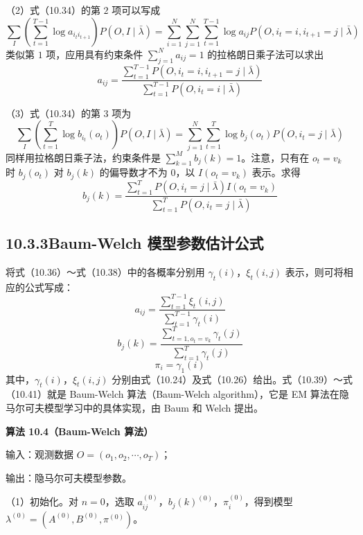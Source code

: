 \documentclass[UTF8,12pt,a4paper,fontset=fandol]{ctexart}
\begin{document}
（2）式（10.34）的第 $2$ 项可以写成
\[
  \sum_I\left(\sum_{t=1}^{T-1}\log a_{i_t i_{t+1}}\right)P(O,I\mid\bar\lambda)
  =
  \sum_{i=1}^N\sum_{j=1}^N\sum_{t=1}^{T-1}\log a_{ij}P(O,i_t=i,i_{t+1}=j\mid\bar\lambda)
\]
类似第 $1$ 项，应用具有约束条件 $\sum_{j=1}^N a_{ij}=1$ 的拉格朗日乘子法可以求出
\begin{equation}
  a_{ij}=
  \frac{\sum_{t=1}^{T-1}P(O,i_t=i,i_{t+1}=j\mid\bar\lambda)}
  {\sum_{t=1}^{T-1}P(O,i_t=i\mid\bar\lambda)}
  \tag{10.37}
\end{equation}

（3）式（10.34）的第 $3$ 项为
\[
  \sum_I\left(\sum_{t=1}^{T}\log b_{i_t}(o_t)\right)P(O,I\mid\bar\lambda)
  =
  \sum_{j=1}^N\sum_{t=1}^{T}\log b_j(o_t)P(O,i_t=j\mid\bar\lambda)
\]
同样用拉格朗日乘子法，约束条件是 $\sum_{k=1}^M b_j(k)=1$。注意，只有在 $o_t=v_k$ 时 $b_j(o_t)$ 对 $b_j(k)$ 的偏导数才不为 $0$，以 $I(o_t=v_k)$ 表示。求得
\begin{equation}
  b_j(k)=
  \frac{\sum_{t=1}^{T}P(O,i_t=j\mid\bar\lambda)I(o_t=v_k)}
  {\sum_{t=1}^{T}P(O,i_t=j\mid\bar\lambda)}
  \tag{10.38}
\end{equation}

\subsection*{10.3.3\quad Baum-Welch 模型参数估计公式}

将式（10.36）～式（10.38）中的各概率分别用 $\gamma_t(i)$，$\xi_t(i,j)$ 表示，则可将相应的公式写成：
\begin{equation}
  a_{ij}=\frac{\sum_{t=1}^{T-1}\xi_t(i,j)}{\sum_{t=1}^{T-1}\gamma_t(i)}
  \tag{10.39}
\end{equation}
\begin{equation}
  b_j(k)=\frac{\sum_{t=1,o_t=v_k}^{T}\gamma_t(j)}{\sum_{t=1}^{T}\gamma_t(j)}
  \tag{10.40}
\end{equation}
\begin{equation}
  \pi_i=\gamma_1(i)
  \tag{10.41}
\end{equation}
其中，$\gamma_t(i)$，$\xi_t(i,j)$ 分别由式（10.24）及式（10.26）给出。式（10.39）～式（10.41）就是 Baum-Welch 算法（Baum-Welch algorithm），它是 EM 算法在隐马尔可夫模型学习中的具体实现，由 Baum 和 Welch 提出。

\noindent\textbf{算法 10.4（Baum-Welch 算法）}\quad

输入：观测数据 $O=(o_1,o_2,\cdots,o_T)$；

输出：隐马尔可夫模型参数。

（1）初始化。对 $n=0$，选取 $a_{ij}^{(0)}$，$b_j(k)^{(0)}$，$\pi_i^{(0)}$，得到模型 $\lambda^{(0)}=(A^{(0)},B^{(0)},\pi^{(0)})$。
\end{document}
